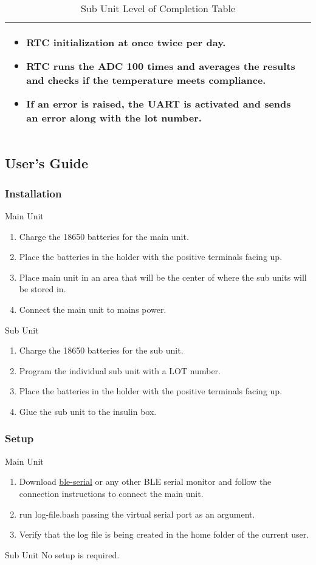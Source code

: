 \begin{landscape}
\begin{table}[!ht]
\begin{tabularx}{\textwidth}{|X|X|}
\begin{itemize}
          \item RTC initialization at once twice per day.
          \item RTC runs the ADC 100 times and averages the results and checks if the temperature meets compliance.
          \item If an error is raised, the UART is activated and sends an error along with the lot number.
        \end{itemize}\\
      \hline
    \end{tabularx}
    \caption{Sub Unit Level of Completion Table}
    \label{tab:sub-unit-completion-table}
  \end{table}
\end{landscape}
\subsection{User’s Guide}
\subsubsection{Installation}
\large{Main Unit}
\normalsize
\begin{enumerate}
  \item Charge the 18650 batteries for the main unit.
  \item Place the batteries in the holder with the positive terminals facing up.
  \item Place main unit in an area that will be the center of where the sub units will be stored in.
  \item Connect the main unit to mains power.
\end{enumerate}
\large{Sub Unit}
\normalsize
\begin{enumerate}
  \item Charge the 18650 batteries for the sub unit.
  \item Program the individual sub unit with a LOT number.
  \item Place the batteries in the holder with the positive terminals facing up.
  \item Glue the sub unit to the insulin box.
\end{enumerate}
\subsubsection{Setup}
\large{Main Unit}
\normalsize
\begin{enumerate}
  \item Download \href{https://pypi.org/project/ble-serial/}{ble-serial} or any other BLE serial monitor and follow the connection instructions to connect the main unit.
  \item run log-file.bash passing the virtual serial port as an argument.
  \item Verify that the log file is being created in the home folder of the current user.
\end{enumerate}
\large{Sub Unit}
\normalsize
No setup is required.

